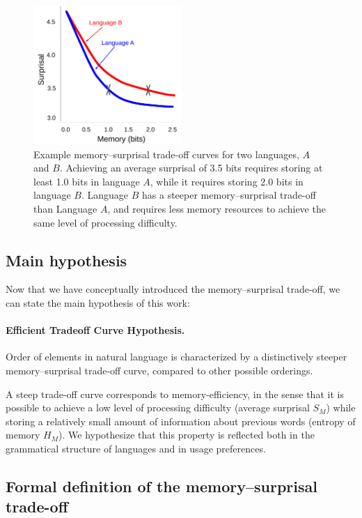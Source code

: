 \begin{figure}
\centering
\includegraphics[width=0.5\textwidth]{figures-gdrive/tradeoff-schematic.pdf}
\caption{Example memory--surprisal trade-off curves for two languages, $A$ and $B$. Achieving an average surprisal of 3.5 bits requires storing at least 1.0 bits in language $A$, while it requires storing 2.0 bits in language $B$. Language $B$ has a steeper memory--surprisal trade-off than Language $A$, and requires less memory resources to achieve the same level of processing difficulty.}
\label{fig:examples}
\end{figure}

\subsection{Main hypothesis}

Now that we have conceptually introduced the memory--surprisal trade-off, we can state the main hypothesis of this work:

\paragraph{Efficient Tradeoff Curve Hypothesis.}  Order of elements in natural language is characterized by a distinctively steeper memory--surprisal trade-off curve, compared to other possible orderings.


A steep trade-off curve corresponds to memory-efficiency, in the sense that it is possible to achieve a low level of processing difficulty (average surprisal $S_M$) while storing a relatively small amount of information about previous words (entropy of memory $H_M$).
We hypothesize that this property is reflected both in the grammatical structure of languages and in usage preferences.


\subsection{Formal definition of the memory--surprisal trade-off}
\label{sec:formal-tradeoff}

